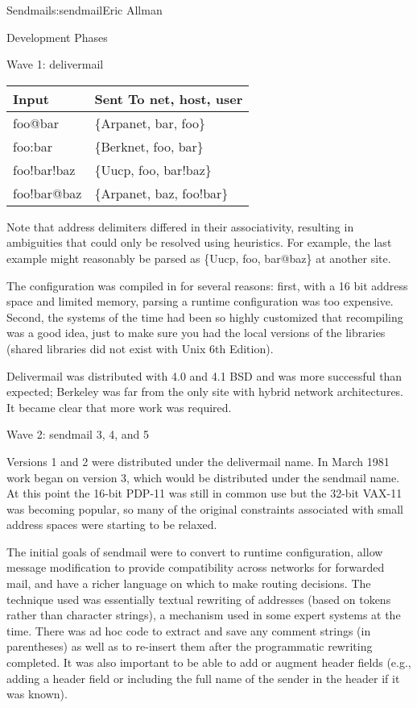 \begin{aosachapter}{Sendmail}{s:sendmail}{Eric Allman}
\begin{aosasect1}{Development Phases}
\begin{aosasect2}{Wave 1: delivermail}
\begin{table}[h!]\centering
\begin{tabular}{|ll|}
\hline
Input & Sent To {net, host, user} \\
\hline
foo@bar & \{Arpanet, bar, foo\} \\
foo:bar & \{Berknet, foo, bar\} \\
foo!bar!baz & \{Uucp, foo, bar!baz\} \\
foo!bar@baz & \{Arpanet, baz, foo!bar\} \\
\hline
\end{tabular}
\end{table}

\noindent
Note that address delimiters differed in their associativity,
resulting in ambiguities that could only be resolved using heuristics.
For example, the last example might reasonably be parsed as
\{Uucp, foo, bar@baz\} 
at another site.

The configuration was compiled in for several reasons: first, with a
16 bit address space and limited memory, parsing a runtime
configuration was too expensive. Second, the systems of the time had
been so highly customized that recompiling was a good idea, just to
make sure you had the local versions of the libraries (shared
libraries did not exist with Unix 6th Edition).

Delivermail was distributed with 4.0 and 4.1 BSD and was more
successful than expected; Berkeley was far from the only site with
hybrid network architectures.  It became clear that more work was
required.

\end{aosasect2}

\begin{aosasect2}{Wave 2: sendmail 3, 4, and 5}

Versions 1 and 2 were distributed under the delivermail name. In March
1981 work began on version 3, which would be distributed under the
sendmail name. At this point the 16-bit PDP-11 was still in common use
but the 32-bit VAX-11 was becoming popular, so many of the original
constraints associated with small address spaces were starting to be
relaxed.

The initial goals of sendmail were to convert to runtime
configuration, allow message modification to provide compatibility
across networks for forwarded mail, and have a richer language on
which to make routing decisions. The technique used was essentially
textual rewriting of addresses (based on tokens rather than
character strings),
a mechanism used in some expert systems at the time. There was ad hoc
code to extract and save any comment strings (in parentheses) as well
as to re-insert them after the programmatic rewriting completed. It
was also important to be able to add or augment header fields (e.g.,
adding a  header field or including the full name of the
sender in the  header if it was known).


\end{aosasect2}
\end{aosasect1}
\end{aosachapter}
